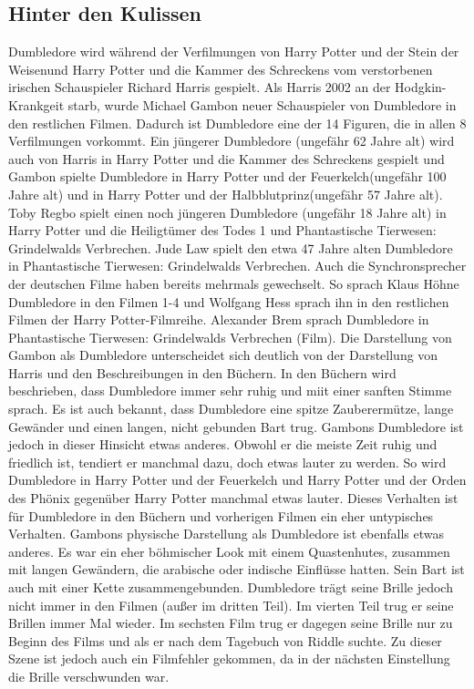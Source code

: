 \documentclass[a4paper, 10pt]{article}
\begin{document}
\subsection*{\Large Hinter den Kulissen}
Dumbledore wird während der Verfilmungen von Harry Potter und der Stein der Weisenund Harry Potter und die Kammer des Schreckens vom verstorbenen irischen Schauspieler Richard Harris gespielt. Als Harris 2002 an der Hodgkin-Krankgeit starb, wurde Michael Gambon neuer Schauspieler von Dumbledore in den restlichen Filmen. Dadurch ist Dumbledore eine der 14 Figuren, die in allen 8 Verfilmungen vorkommt.
\vspace{10pt}
\newline
Ein jüngerer Dumbledore (ungefähr 62 Jahre alt) wird auch von Harris in Harry Potter und die Kammer des Schreckens gespielt und Gambon spielte Dumbledore in Harry Potter und der Feuerkelch(ungefähr 100 Jahre alt) und in Harry Potter und der Halbblutprinz(ungefähr 57 Jahre alt). Toby Regbo spielt einen noch jüngeren Dumbledore (ungefähr 18 Jahre alt) in Harry Potter und die Heiligtümer des Todes 1 und Phantastische Tierwesen: Grindelwalds Verbrechen.
\vspace{10pt}
\newline
Jude Law spielt den etwa 47 Jahre alten Dumbledore in Phantastische Tierwesen: Grindelwalds Verbrechen.
Auch die Synchronsprecher der deutschen Filme haben bereits mehrmals gewechselt. So sprach Klaus Höhne Dumbledore in den Filmen 1-4 und Wolfgang Hess sprach ihn in den restlichen Filmen der Harry Potter-Filmreihe. Alexander Brem sprach Dumbledore in Phantastische Tierwesen: Grindelwalds Verbrechen (Film).
Die Darstellung von Gambon als Dumbledore unterscheidet sich deutlich von der Darstellung von Harris und den Beschreibungen in den Büchern. In den Büchern wird beschrieben, dass Dumbledore immer sehr ruhig und miit einer sanften Stimme sprach. Es ist auch bekannt, dass Dumbledore eine spitze Zauberermütze, lange Gewänder und einen langen, nicht gebunden Bart trug. Gambons Dumbledore ist jedoch in dieser Hinsicht etwas anderes. Obwohl er die meiste Zeit ruhig und friedlich ist, tendiert er manchmal dazu, doch etwas lauter zu werden. So wird Dumbledore in Harry Potter und der Feuerkelch und Harry Potter und der Orden des Phönix gegenüber Harry Potter manchmal etwas lauter. Dieses Verhalten ist für Dumbledore in den Büchern und vorherigen Filmen ein eher untypisches Verhalten.
\vspace{10pt}
\newline
Gambons physische Darstellung als Dumbledore ist ebenfalls etwas anderes. Es war ein eher böhmischer Look mit einem Quastenhutes, zusammen mit langen Gewändern, die arabische oder indische Einflüsse hatten. Sein Bart ist auch mit einer Kette zusammengebunden. Dumbledore trägt seine Brille jedoch nicht immer in den Filmen (außer im dritten Teil). Im vierten Teil trug er seine Brillen immer Mal wieder. Im sechsten Film trug er dagegen seine Brille nur zu Beginn des Films und als er nach dem Tagebuch von Riddle suchte. Zu dieser Szene ist jedoch auch ein Filmfehler gekommen, da in der nächsten Einstellung die Brille verschwunden war.
\end{document}
